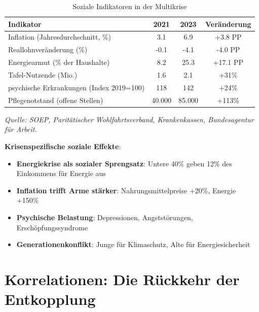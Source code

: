 \begin{table}[ht]
    \centering
    \caption{Soziale Indikatoren in der Multikrise}
    \label{tab:sozial_multikrise}
    \begin{tabular}{lccc}
        \toprule
        \textbf{Indikator} & \textbf{2021} & \textbf{2023} & \textbf{Veränderung} \\
        \midrule
        Inflation (Jahresdurchschnitt, \%) & 3.1 & 6.9 & +3.8 PP \\
        Reallohnveränderung (\%) & -0.1 & -4.1 & -4.0 PP \\
        Energiearmut (\% der Haushalte) & 8.2 & 25.3 & +17.1 PP \\
        Tafel-Nutzende (Mio.) & 1.6 & 2.1 & +31\% \\
        psychische Erkrankungen (Index 2019=100) & 118 & 142 & +24\% \\
        Pflegenotstand (offene Stellen) & 40.000 & 85.000 & +113\% \\
        \bottomrule
    \end{tabular}
\end{table}

\begin{flushleft}
\footnotesize{\textit{Quelle: SOEP, Paritätischer Wohlfahrtsverband, Krankenkassen, Bundesagentur für Arbeit.}}
\end{flushleft}

\textbf{Krisenspezifische soziale Effekte}:

\begin{itemize}
    \item \textbf{Energiekrise als sozialer Sprengsatz}: Untere 40\% geben 12\% des Einkommens für Energie aus
    \item \textbf{Inflation trifft Arme stärker}: Nahrungsmittelpreise +20\%, Energie +150\%
    \item \textbf{Psychische Belastung}: Depressionen, Angststörungen, Erschöpfungssyndrome
    \item \textbf{Generationenkonflikt}: Junge für Klimaschutz, Alte für Energiesicherheit
\end{itemize}

\section{Korrelationen: Die Rückkehr der Entkopplung}

